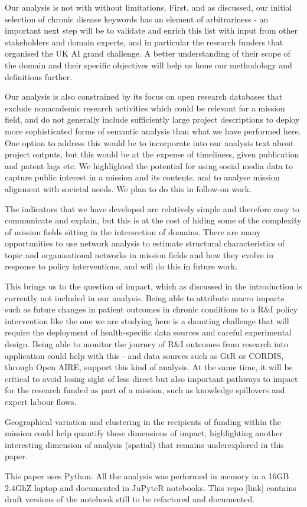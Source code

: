 \documentclass[11pt]{article}
\begin{document}
Our analysis is not with without limitations. First, and as discussed, our initial selection of chronic disease keywords has an element of arbitrariness - an important next step will be to validate and enrich this list with input from other stakeholders and domain experts, and in particular the research funders that organised the UK AI grand challenge. A better understanding of their scope of the domain and their specific objectives will help us hone our
methodology and definitions further.

Our analysis is also constrained by its focus on open research databases that exclude nonacademic research activities which could be relevant for a mission field, and do not generally include sufficiently large project descriptions to deploy more sophisticated forms of semantic analysis than what we have performed here. One option to address this would be to incorporate
into our analysis text about project outputs, but this would be at the expense of timeliness, given publication and patent lags etc. We highlighted the potential for using social media data to capture public interest in a mission and its contents, and to analyse mission alignment with societal needs. We plan to do this in follow-on work.

The indicators that we have developed are relatively simple and therefore easy to communicate and explain, but this is at the cost of hiding some of the complexity of mission fields sitting in the intersection of domains. There are many opportunities to use network analysis to estimate structural characteristics of topic and organisational networks in mission fields and how they evolve in response to policy interventions, and will do this in future
work. 

This brings us to the question of impact, which as discussed in the introduction is currently not included in our analysis. Being able to attribute macro impacts such as future changes in patient outcomes in chronic conditions to a R&I policy intervention like the one we are studying here is a daunting challenge that will require the deployment of health-specific data
sources and careful experimental design. Being able to monitor the journey of R&I outcomes from research into application could help with this - and data sources such as GtR or CORDIS, through Open AIRE, support this kind of analysis. At the same time, it will be critical to avoid losing sight of less direct but also important pathways to impact for the research funded as part of a mission, such as knowledge spillovers and expert labour flows.

Geographical variation and clustering in the recipients of funding within the mission could help quantify these dimensions of impact, highlighting another interesting dimension of analysis (spatial) that remains underexplored in this paper. 

This paper uses Python. All the analysis was performed in memory in a 16GB 2.4GhZ laptop and documented in JuPyteR notebooks. This repo [link] contains draft versions of the notebook still to be refactored and documented.


%
\end{document}
